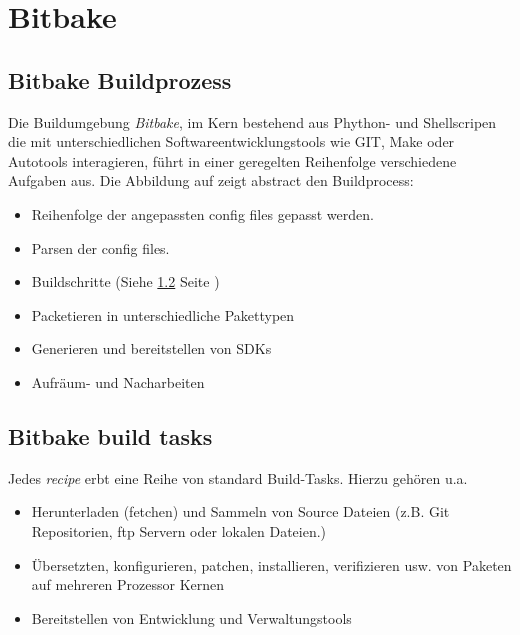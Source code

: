 

\chapter{Bitbake}%
\label{cha:bitbake}

\section{Bitbake Buildprozess}%
\label{sec:bitbake_buildprozess}



Die Buildumgebung \textit{Bitbake}, im Kern bestehend aus Phython- und
Shellscripen die mit unterschiedlichen Softwareentwicklungstools wie GIT, Make
oder Autotools interagieren, führt in einer geregelten Reihenfolge verschiedene
Aufgaben aus. Die Abbildung auf \cite[S. 20]{Gonzalez2018:Embedded_Linux_Development_Using_Yocto_Project_Cookbook_2nd}
zeigt abstract den Build\-process:

\begin{itemize}
    \item Reihenfolge der angepassten config files gepasst werden.
    \item Parsen der config files.
    \item Buildschritte (Siehe \ref{sec:bitbake_build_tasks} Seite
        \pageref{sec:bitbake_build_tasks})
    \item Packetieren in unterschiedliche Pakettypen
    \item Generieren und bereitstellen von \aclp{SDK}
    \item Aufräum- und Nacharbeiten
\end{itemize}

\section{Bitbake build tasks}%
\label{sec:bitbake_build_tasks}

Jedes \textit{recipe} erbt eine Reihe von standard Build-Tasks.  Hierzu
gehören u.a.
\begin{itemize}
    \item Herunterladen (fetchen) und Sammeln von Source Dateien
        (z.B. Git Repositorien, ftp Servern oder lokalen Dateien.)
    \item Übersetzten, konfigurieren, patchen, installieren, verifizieren usw.
        von Paketen auf mehreren Prozessor Kernen
    \item Bereitstellen von Entwicklung und Verwaltungstools
\end{itemize}

